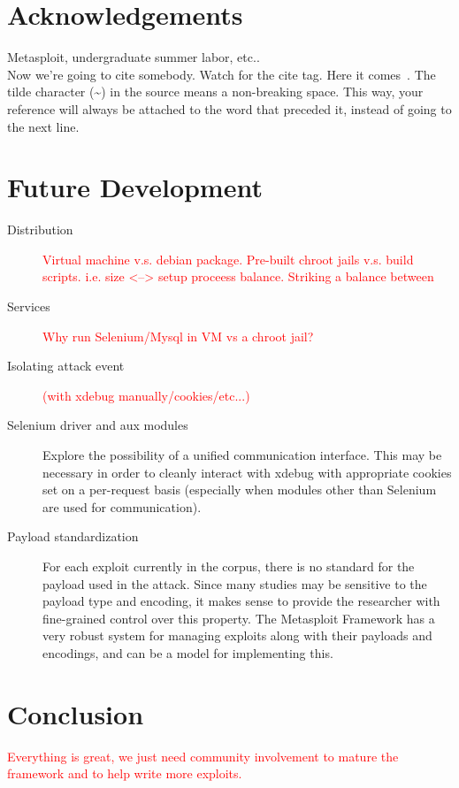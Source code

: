\documentclass[letterpaper,twocolumn,10pt]{article}
\begin{document}
\section{Acknowledgements}

Metasploit, undergraduate summer labor, etc..\\
Now we're going to cite somebody.  Watch for the cite tag.
Here it comes~.  The tilde character (\~{})
in the source means a non-breaking space.  This way, your reference will
always be attached to the word that preceded it, instead of going to the
next line.

\section{Future Development}
 \begin{description}
   \item[Distribution]
     \textcolor{red}{Virtual machine v.s. debian package. Pre-built chroot jails v.s. build scripts.
     i.e. size <--> setup proceess balance. Striking a balance between}
   \item[Services]
     \textcolor{red}{Why run Selenium/Mysql in VM vs a chroot jail?}
   \item[Isolating attack event]
     \textcolor{red}{(with xdebug manually/cookies/etc...)}   
   \item[Selenium driver and aux modules]
   Explore the possibility of a unified communication interface. This may be necessary in order to cleanly interact with xdebug with appropriate cookies set on a per-request basis (especially when modules other than Selenium are used for communication).
   \item[Payload standardization]
For each exploit currently in the corpus, there is no standard for the payload used in the attack. Since many studies may be sensitive to the payload type and encoding, it makes sense to provide the researcher with fine-grained control over this property. The Metasploit Framework has a very robust system for managing exploits along with their payloads and encodings, and can be a model for implementing this.
 \end{description}


\section{Conclusion}
\textcolor{red}{
Everything is great, we just need community involvement to mature the framework and to help write more exploits.
}
\end{document}
